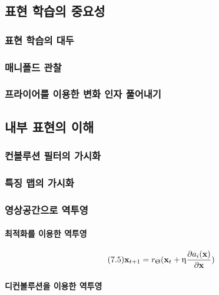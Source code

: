 \documentclass [12pt] {oblivoir}
\let\oldsubsubsection=\subsubsection
\renewcommand{\subsubsection}
{
  \filbreak
  \oldsubsubsection
}
\begin{document}
\subsection{표현 학습의 중요성}

\subsubsection{표현 학습의 대두}

\subsubsection{매니폴드 관찰}

\subsubsection{프라이어를 이용한 변화 인자 풀어내기}

\subsection{내부 표현의 이해}

\subsubsection{컨볼루션 필터의 가시화}

\subsubsection{특징 맵의 가시화}

\subsubsection{영상공간으로 역투영}

\paragraph*{최적화를 이용한 역투영}\mbox{}

\begin{equation} \tag{7.5}
  \mathbf{x}_{t+1} = r_{\Uptheta}(\mathbf{x}_{t} + \upeta\frac{\partial a_{i}(\mathbf{x})}{\partial \mathbf{x}})
\end{equation}

\vspace{3mm}

\paragraph*{디컨볼루션을 이용한 역투영}\mbox{}
\end{document}
